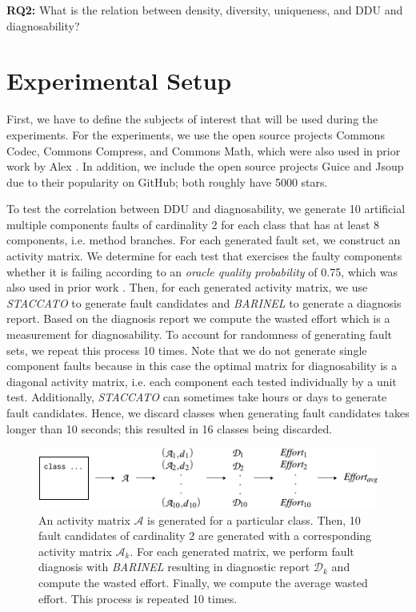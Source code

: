 \documentclass[twoside,a4paper,11pt]{memoir}
\begin{document}
\begin{framed}
\noindent
\textbf{RQ2:} What is the relation between density, diversity, uniqueness, and DDU and diagnosability?
\end{framed}


\section{Experimental Setup}
\label{sec:rq2_experimental_setup}
First, we have to define the subjects of interest that will be used during the experiments.
For the experiments, we use the open source projects Commons Codec, Commons Compress, and Commons Math, which were also used in prior work by Alex \etal \cite{DBLP:conf/icse/PerezAD17}.
In addition, we include the open source projects Guice and Jsoup due to their popularity on GitHub; both roughly have 5000 stars.

To test the correlation between DDU and diagnosability, we generate 10 artificial multiple components faults of cardinality 2 for each class that has at least 8 components, i.e. method branches.
For each generated fault set, we construct an activity matrix.
We determine for each test that exercises the faulty components whether it is failing according to an \emph{oracle quality probability} of 0.75, which was also used in prior work \cite{DBLP:conf/icse/PerezAD17}.
Then, for each generated activity matrix, we use \emph{STACCATO} to generate fault candidates and \emph{BARINEL} to generate a diagnosis report.
Based on the diagnosis report we compute the wasted effort which is a measurement for diagnosability.
To account for randomness of generating fault sets, we repeat this process 10 times.
Note that we do not generate single component faults because in this case the optimal matrix for diagnosability is a diagonal activity matrix, i.e. each component each tested individually by a unit test.
Additionally, \emph{STACCATO} can sometimes take hours or days to generate fault candidates.
Hence, we discard classes when generating fault candidates takes longer than 10 seconds; this resulted in 16 classes being discarded.

\begin{figure}
  \includegraphics[width=\linewidth]{figures/fault_generation}
  \caption{An activity matrix $\mathcal{A}$ is generated for a particular class. Then, 10 fault candidates of cardinality 2 are generated with a corresponding activity matrix $\mathcal{A}_k$. For each generated matrix, we perform fault diagnosis with \emph{BARINEL} resulting in diagnostic report $\mathcal{D}_k$ and compute the wasted effort. Finally, we compute the average wasted effort. This process is repeated 10 times.}
  \label{fig:fault_generation}
\end{figure}
\end{document}

